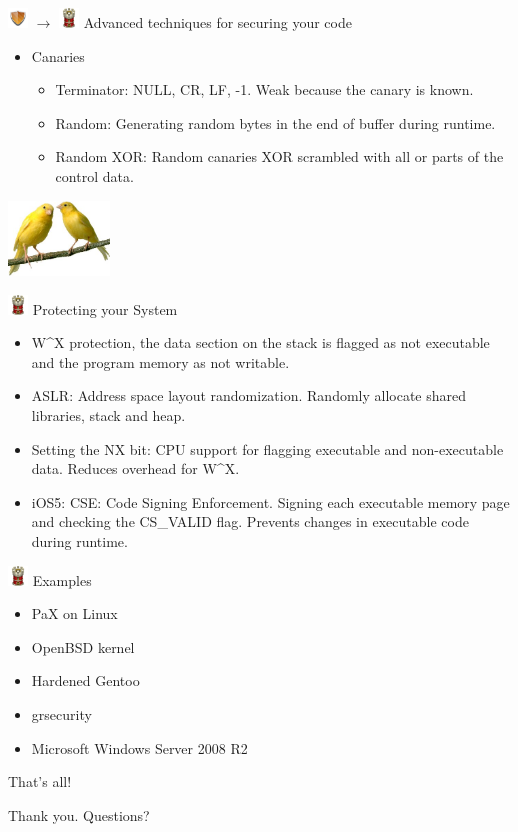 \documentclass{beamer}
\newcommand{\shield}{\includegraphics[width=15pt]{shield.png} \hspace*{5pt}}
\newcommand{\castle}{\includegraphics[width=15pt]{castle.png} \hspace*{5pt}}
\begin{document}
\begin{frame}{\shield $\rightarrow$ \castle Advanced techniques for securing your code}
\begin{center}
\begin{itemize}
\item Canaries
\begin{itemize}
\item Terminator: NULL, CR, LF, -1. Weak because the canary is known.
\item Random: Generating random bytes in the end of buffer during runtime.
\item Random XOR: Random canaries XOR scrambled with all or parts of the control data.
\end{itemize}
\end{itemize}
\includegraphics[height=2cm]{canaries.jpg}
\end{center}
\end{frame}

\begin{frame}{\castle Protecting your System}
\begin{itemize}
\item W\textasciicircum X protection, the data section on the stack is flagged as not executable and the program memory as not writable.
\pause
\item ASLR: Address space layout randomization. Randomly allocate shared libraries, stack and heap.
\pause
\item Setting the NX bit: CPU support for flagging executable and non-executable data. Reduces overhead for W\textasciicircum X.
\pause
\item iOS5: CSE: Code Signing Enforcement. Signing each executable memory page and checking the CS\_VALID flag. Prevents changes in executable code during runtime.
\end{itemize}
\end{frame}

\begin{frame}{\castle Examples}
\begin{itemize}
\item PaX on Linux
\pause
\item OpenBSD kernel
\pause
\item Hardened Gentoo
\pause
\item grsecurity
\pause
\item Microsoft Windows Server 2008 R2
\end{itemize}
\end{frame}

\begin{frame}{That's all!}

{\Huge Thank you. Questions?}
\end{frame}
\end{document}
